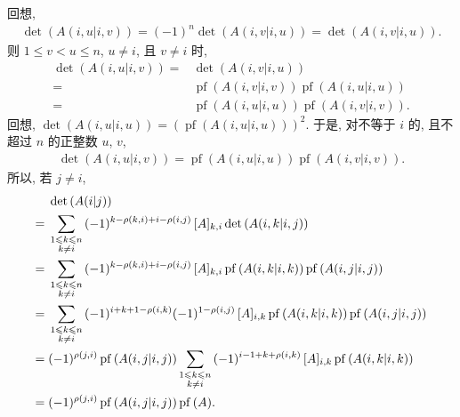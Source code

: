 \documentclass[../libro.tex]{subfiles}
\begin{document}
\begin{example}
    回想,
    \begin{align*}
        \det {(A({i,u}|{i,v}))}
        = (-1)^n \det {(A({i,v}|{i,u}))}
        = \det {(A({i,v}|{i,u}))}.
    \end{align*}
    则 \(1 \leq v < u \leq n\),
    \(u \neq i\), 且 \(v \neq i\) 时,
    \begin{align*}
        \det {(A({i,u}|{i,v}))}
        = {} &
        \det {(A({i,v}|{i,u}))}
        \\
        = {} &
        \operatorname{pf} {(A({i,v}|{i,v}))}
        \operatorname{pf} {(A({i,u}|{i,u}))}
        \\
        = {} &
        \operatorname{pf} {(A({i,u}|{i,u}))}
        \operatorname{pf} {(A({i,v}|{i,v}))}.
    \end{align*}
    回想, \(\det {(A({i,u}|{i,u}))}
    = (\operatorname{pf} {(A({i,u}|{i,u}))})^2\).
    于是, 对不等于 \(i\) 的,
    且不超过 \(n\) 的正整数 \(u\), \(v\),
    \begin{align*}
        \det {(A({i,u}|{i,v}))}
        = \operatorname{pf} {(A({i,u}|{i,u}))}
        \operatorname{pf} {(A({i,v}|{i,v}))}.
    \end{align*}
    所以, 若 \(j \neq i\),
    \begin{align*}
        &
        \det {(A(i|j))}
        \\
        = {} &
        \sum_{\substack{1 \leqslant k \leqslant n \\ k \neq i}}
        {(-1)^{k - \rho(k, i) + i - \rho(i, j)}\,
        [A]_{k,i} \det {(A({i,k}|{i,j}))}}
        \\
        = {} &
        \sum_{\substack{1 \leqslant k \leqslant n \\ k \neq i}}
        {(-1)^{k - \rho(k, i) + i - \rho(i, j)}\,
            [A]_{k,i}
            \operatorname{pf} {(A({i,k}|{i,k}))}
        \operatorname{pf} {(A({i,j}|{i,j}))}}
        \\
        = {} &
        \sum_{\substack{1 \leqslant k \leqslant n \\ k \neq i}}
        {(-1)^{i + k + 1 - \rho(i, k)} (-1)^{1 - \rho(i, j)}\,
            [A]_{i,k}
            \operatorname{pf} {(A({i,k}|{i,k}))}
        \operatorname{pf} {(A({i,j}|{i,j}))}}
        \\
        = {} &
        (-1)^{\rho(j, i)}
        \operatorname{pf} {(A({i,j}|{i,j}))}
        \sum_{\substack{1 \leqslant k \leqslant n \\ k \neq i}}
        {(-1)^{i - 1 + k + \rho(i, k)}\,
            [A]_{i,k}
        \operatorname{pf} {(A({i,k}|{i,k}))}}
        \\
        = {} &
        (-1)^{\rho(j, i)}
        \operatorname{pf} {(A({i,j}|{i,j}))}
        \operatorname{pf} {(A)}.
        \qedhere
    \end{align*}
\end{example}
\end{document}
